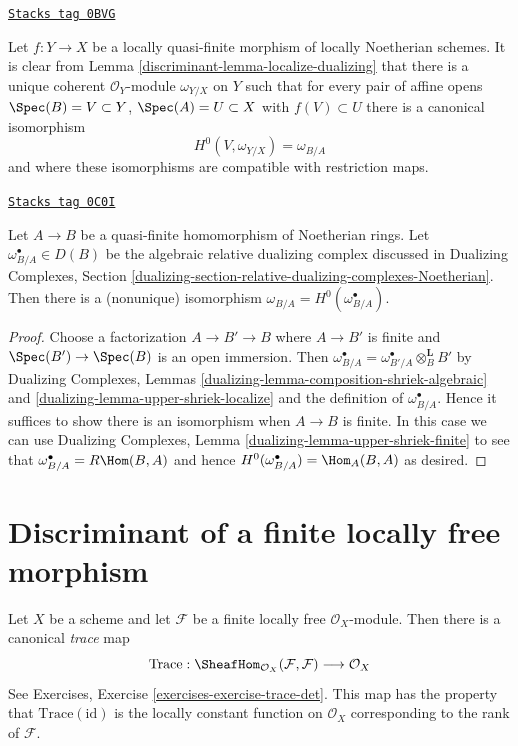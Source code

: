 \begin{remark}
\label{discriminant-remark-relative-dualizing-for-quasi-finite}
\href{https://stacks.math.columbia.edu/tag/0BVG}{\texttt{Stacks tag 0BVG}}

Let $f : Y \to X$ be a locally quasi-finite morphism of locally Noetherian
schemes. It is clear from Lemma \ref{discriminant-lemma-localize-dualizing}
that there is a unique coherent $\mathcal{O}_Y$-module
$\omega_{Y/X}$ on $Y$ such that for every pair of affine opens
$\Spec(B) = V \subset Y$, $\Spec(A) = U \subset X$ with $f(V) \subset U$
there is a canonical isomorphism
$$
H^0(V, \omega_{Y/X}) = \omega_{B/A}
$$
and where these isomorphisms are compatible with restriction maps.
\end{remark}

\begin{lemma}
\label{discriminant-lemma-compare-dualizing-algebraic}
\href{https://stacks.math.columbia.edu/tag/0C0I}{\texttt{Stacks tag 0C0I}}

Let $A \to B$ be a quasi-finite homomorphism of Noetherian rings.
Let $\omega_{B/A}^\bullet \in D(B)$ be the algebraic relative dualizing
complex discussed in Dualizing Complexes, Section
\ref{dualizing-section-relative-dualizing-complexes-Noetherian}.
Then there is a (nonunique) isomorphism
$\omega_{B/A} = H^0(\omega_{B/A}^\bullet)$.
\end{lemma}

\begin{proof}
Choose a factorization $A \to B' \to B$
where $A \to B'$ is finite and $\Spec(B') \to \Spec(B)$
is an open immersion. Then
$\omega_{B/A}^\bullet = \omega_{B'/A}^\bullet \otimes_B^\mathbf{L} B'$
by Dualizing Complexes, Lemmas
\ref{dualizing-lemma-composition-shriek-algebraic} and
\ref{dualizing-lemma-upper-shriek-localize} and
the definition of $\omega_{B/A}^\bullet$. Hence
it suffices to show there is an isomorphism when $A \to B$ is finite.
In this case we can use
Dualizing Complexes, Lemma \ref{dualizing-lemma-upper-shriek-finite}
to see that $\omega_{B/A}^\bullet = R\Hom(B, A)$ and hence
$H^0(\omega^\bullet_{B/A}) = \Hom_A(B, A)$ as desired.
\end{proof}

\section{Discriminant of a finite locally free morphism}
\label{discriminant-section-discriminant}
Let $X$ be a scheme and let $\mathcal{F}$ be a finite locally
free $\mathcal{O}_X$-module. Then there is a canonical {\it trace} map
$$
\text{Trace} :
\SheafHom_{\mathcal{O}_X}(\mathcal{F}, \mathcal{F})
\longrightarrow
\mathcal{O}_X
$$
See Exercises, Exercise \ref{exercises-exercise-trace-det}. This map has
the property that $\text{Trace}(\text{id})$ is the locally constant function
on $\mathcal{O}_X$ corresponding to the rank of $\mathcal{F}$.

